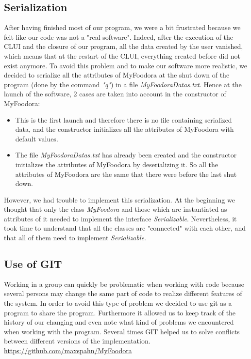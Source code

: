 \subsection{Serialization}
\label{sub:serialization}
After having finished most of our program, we were a bit frustrated because we felt like our code was not a "real software". Indeed, after the execution of the CLUI and the closure of our program, all the data created by the user vanished, which means that at the restart of the CLUI, everything created before did not exist anymore. To avoid this problem and to make our software more realistic, we decided to serialize all the attributes of MyFoodora at the shut down of the program (done by the command \textit{"q"}) in a file \textit{MyFoodoraDatas.txt}.
Hence at the launch of the software, 2	cases are taken into account in the constructor of MyFoodora:
\begin{itemize}
	\item{} This is the first launch and therefore there is no file containing serialized data, and the constructor initializes all the attributes of MyFoodora with default values.
	\item{} The file \textit{MyFoodoraDatas.txt} has already been created and the constructor initializes the attributes of MyFoodora by deserializing it. So all the attributes of MyFoodora are the same that there were before the last shut down. 	
\end{itemize}

However, we had trouble to implement this serialization. At the beginning we thought that only the class \textit{MyFoodora} and those which are instantiated as attributes of it needed to implement the interface \textit{Serializable}. Nevertheless, it took time to understand that all the classes are "connected" with each other, and that all of them need to implement \textit{Serializable}.

\subsection{Use of GIT}
\label{sub:use_of_git}

Working in a group can quickly be problematic when working with code because several persons
may change the same part of code to realize different features of the system. In order to 
avoid this type of problem we decided to use git as a program to share the program. 
Furthermore it allowed us to keep track of the history of our changing and even note what
kind of problems we encountered when working with the program. Several times \textsc{GIT}
helped us to solve conflicts between different versions of the implementation.
\url{https://github.com/maxspahn/MyFoodora}
